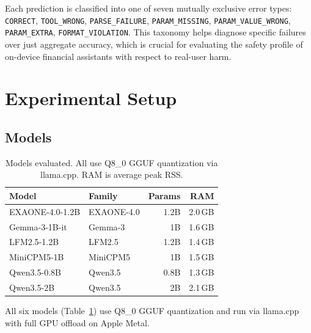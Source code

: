 \documentclass[11pt,twocolumn]{article}
\begin{document}
Each prediction is classified into one of seven mutually exclusive
error types: \texttt{CORRECT}, \texttt{TOOL\_WRONG},
\texttt{PARSE\_FAILURE}, \texttt{PARAM\_MISSING},
\texttt{PARAM\_VALUE\_WRONG}, \texttt{PARAM\_EXTRA},
\texttt{FORMAT\_VIOLATION}.
This taxonomy helps diagnose specific failures over just aggregate
accuracy, which is crucial for evaluating the safety profile
of on-device financial assistants with respect to real-user harm.

\section{Experimental Setup}

\subsection{Models}

\begin{table}[t]
\centering
\footnotesize
\setlength{\tabcolsep}{4pt}
\begin{tabular}{@{}p{2.8cm}p{2.0cm}rr@{}}
\toprule
\textbf{Model} & \textbf{Family} & \textbf{Params} & \textbf{RAM} \\
\midrule
EXAONE-4.0-1.2B & EXAONE-4.0 \citeyearpar{lgai2025exaone} & 1.2B & 2.0\,GB \\
Gemma-3-1B-it   & Gemma-3 \citeyearpar{team2025gemma}     & 1B   & 1.6\,GB \\
LFM2.5-1.2B     & LFM2.5 \citeyearpar{liquidai2026lfm25}  & 1.2B & 1.4\,GB \\
MiniCPM5-1B     & MiniCPM5 \citeyearpar{openbmb2026minicpm5}       & 1B   & 1.5\,GB \\
Qwen3.5-0.8B    & Qwen3.5 \citeyearpar{qwen2026qwen35}    & 0.8B & 1.3\,GB \\
Qwen3.5-2B      & Qwen3.5 \citeyearpar{qwen2026qwen35}    & 2B   & 2.1\,GB \\
\bottomrule
\end{tabular}
\caption{Models evaluated. All use Q8\_0 GGUF quantization via
llama.cpp. RAM is average peak RSS.}
\label{tab:models}
\end{table}

All six models (Table~\ref{tab:models}) use Q8\_0 GGUF quantization
and run via llama.cpp \citep{llamacpp2023} with full GPU offload on
Apple Metal.
\end{document}
